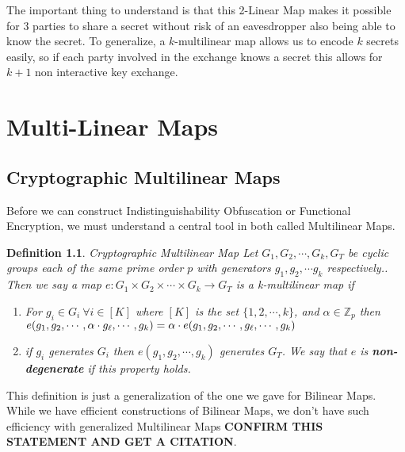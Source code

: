 \documentclass[12pt,twoside]{reedthesis}
\newtheorem{definition}{Definition}
\begin{document}
\par The important thing to understand is that this 2-Linear Map makes it possible for 3 parties to share a secret without risk of an eavesdropper also being able to know the secret. To generalize, a $k$-multilinear map allows us to encode $k$ secrets easily, so if each party involved in the exchange knows a secret this allows for $k+1$ non interactive key exchange.
    
    \chapter{Multi-Linear Maps}
    
    \section{Cryptographic Multilinear Maps}
    
    Before we can construct Indistinguishability Obfuscation or Functional Encryption, we must understand a central tool in both called Multilinear Maps.
    
    \begin{definition}{Cryptographic Multilinear Map}
    Let $G_1,G_2, \cdots, G_k,G_T$ be cyclic groups each of the same prime order $p$ with generators $g_1,g_2,\cdots g_k$ respectively.. Then we say a map $e:G_1 \times G_2 \times \cdots \times G_k \rightarrow G_T$ is a k-multilinear map if
    
    \begin{enumerate}
    \item For $g_i \in G_i \: \forall i \in [K]$ where $[K]$ is the set $\{1,2,\cdots,k \}$, and $\alpha \in \mathbb{Z}_p$ then $e(g_1, g_2, \cdots, \alpha \cdot g_\ell , \cdots , g_k) =\alpha \cdot e(g_1, g_2, \cdots, g_\ell , \cdots , g_k) \\$
    \item if $g_i$ generates $G_i$ then $e(g_1,g_2,\cdots , g_k)$ generates $G_T$. We say that $e$ is \textbf{non-degenerate} if this property holds.
    \end{enumerate}
    \end{definition}
    
    This definition is just a generalization of the one we gave for Bilinear Maps. While we have efficient constructions of Bilinear Maps, we don't have such efficiency with generalized Multilinear Maps \textbf{CONFIRM THIS STATEMENT AND GET A CITATION}.
    
            
    
\end{document}
